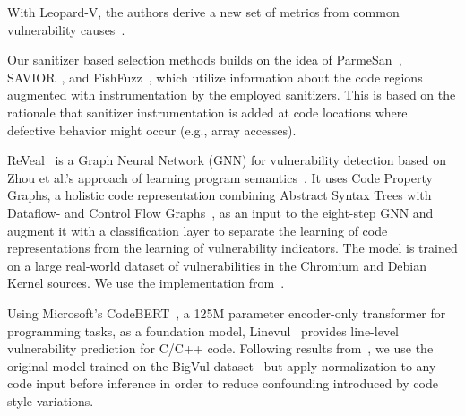 With Leopard-V, the authors derive a new set of metrics from common vulnerability causes~\cite{DuCheLiGuo+19}. 

Our sanitizer based selection methods builds on the idea of ParmeSan~\cite{OstRazBosGiu+20}, SAVIOR~\cite{CheLiXuGuo+20}, and FishFuzz~\cite{ZheZhaHuaRen+23}, which utilize information about the code regions augmented with instrumentation by the employed sanitizers. This is based on the rationale that sanitizer instrumentation is added at code locations where defective behavior might occur (e.g., array accesses).

ReVeal~\cite{ChaKriDinRay+21} is a Graph Neural Network (GNN) for vulnerability detection based on Zhou et al.'s approach of learning program semantics~\cite{ZhoLiuSioDu+19}.
It uses Code Property Graphs, a holistic code representation combining Abstract Syntax Trees with Dataflow- and Control Flow Graphs~\cite{YamGolArpRie+14}, as an input to the eight-step GNN and augment it with a classification layer to separate the learning of code representations from the learning of vulnerability indicators.
The model is trained on a large real-world dataset of vulnerabilities in the Chromium and Debian Kernel sources. 
We use the implementation from~\cite{revealGH}.

Using Microsoft's CodeBERT~\cite{feng-etal-2020-codebert}, a 125M parameter encoder-only transformer for programming tasks, as a foundation model, Linevul~\cite{FuTan+22} provides line-level vulnerability prediction for C/C++ code. 
Following results from~\cite{brokenPromises}, we use the original model trained on the BigVul dataset~\cite{bigvul} but apply normalization to any code input before inference in order to reduce confounding introduced by code style variations. 

